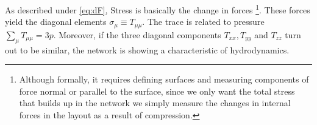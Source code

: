 \documentclass[nofootinbib,preprint,floatfix,endfloats]{revtex4} %
\begin{document}
As described under \eqref{eq:dF}, Stress is basically the change in forces
\footnote{Although formally, it requires defining surfaces and measuring components of force normal or parallel to the surface, since we only want the total stress that builds up in the network we simply measure the changes in internal forces in the layout as a result of compression.}.
These forces yield 
the  diagonal elements $ \sigma_\mu \equiv T_{\mu\mu}$. 
The trace  is related to pressure $\sum_\mu T_{\mu\mu} = 3p$. 
Moreover, if the three diagonal  components $T_{xx}, T_{yy}$ and $T_{zz}$ turn out to be similar, the network is showing a characteristic of hydrodynamics. 
\end{document}
